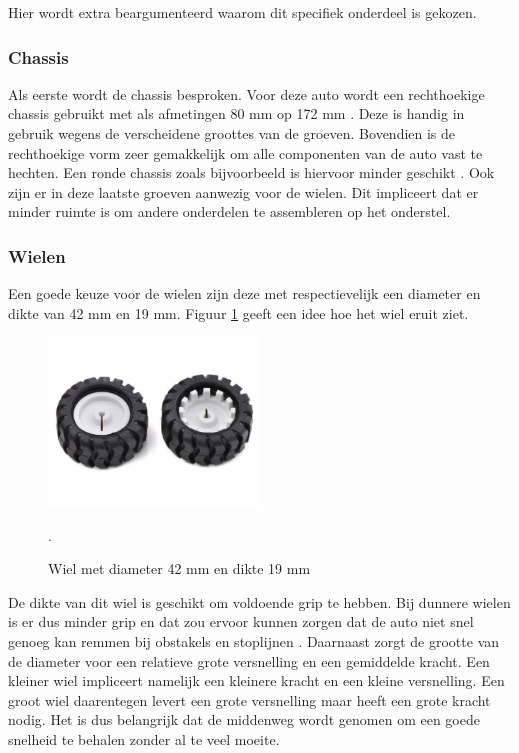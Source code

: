 \documentclass[a4paper,twoside,kulak]{kulakreport} %
\begin{document}
Hier wordt extra beargumenteerd waarom dit specifiek onderdeel is gekozen.
\label{Ontwerpskeuze}

\subsubsection{Chassis}
Als eerste wordt de chassis besproken. Voor deze auto wordt een rechthoekige chassis gebruikt met als afmetingen 80 mm op 172 mm  \cite{RobotChassisRechthoekigZwart}. 
Deze is handig in gebruik wegens de verscheidene groottes van de groeven. Bovendien is de rechthoekige vorm zeer gemakkelijk om alle componenten van de auto vast te hechten. Een ronde chassis zoals bijvoorbeeld is hiervoor minder geschikt \cite{RobotChassis}. Ook zijn er in deze laatste groeven aanwezig voor de wielen.%
Dit impliceert dat er minder ruimte is om andere onderdelen te assembleren op het onderstel. 
\label{Chassis}
~
\subsubsection{Wielen}
Een goede keuze voor de wielen zijn deze met respectievelijk een diameter en dikte van 42 mm en 19 mm.
Figuur \ref{fig:wiel} geeft een idee hoe het wiel eruit ziet.

\begin{figure}
	\includegraphics[width=0.5\textwidth]{wielen}
	\centering
	\caption{ Wiel met diameter 42 mm en dikte 19 mm} 
	\cite{Wiel42x19mm}.
	\label{fig:wiel}
\end{figure}

 De dikte van dit wiel is geschikt om voldoende grip te hebben. Bij dunnere wielen is er dus minder grip en dat zou ervoor kunnen zorgen dat de auto niet snel genoeg kan remmen bij obstakels en stoplijnen \cite{Banden}. 
 Daarnaast zorgt de grootte van de diameter voor een relatieve grote versnelling en een gemiddelde kracht. Een kleiner wiel impliceert namelijk een kleinere kracht en een kleine versnelling. Een groot wiel daarentegen levert een grote versnelling maar heeft een grote kracht nodig. Het is dus belangrijk dat de middenweg wordt genomen om een goede snelheid te behalen zonder al te veel moeite.  
\end{document}
